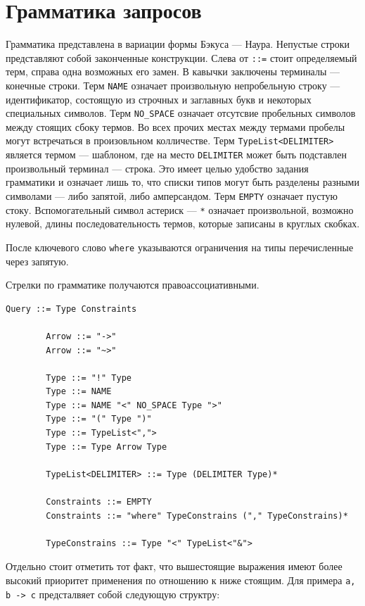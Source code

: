 \documentclass[times]{itmo-student-thesis}
\begin{document}
	\section{Грамматика запросов}
	Грамматика представлена в вариации формы Бэкуса — Наура. Непустые строки представляют собой законченные конструкции. Слева от \lstinline{::=} стоит определяемый терм, справа одна возможных его замен. В кавычки заключены терминалы --- конечные строки. Терм \lstinline{NAME} означает произвольную непробельную строку --- идентификатор, состоящую из строчных и заглавных букв и некоторых специальных символов. Терм \lstinline{NO_SPACE} означает отсутсвие пробельных символов между стоящих сбоку термов. Во всех прочих местах между термами пробелы могут встречаться в произовльном колличестве. Терм \lstinline{TypeList<DELIMITER>} является термом --- шаблоном, где на место \lstinline{DELIMITER} может быть подставлен произвольный терминал --- строка. Это имеет целью удобство задания грамматики и означает лишь то, что списки типов могут быть разделены разными символами --- либо запятой, либо амперсандом. Терм \lstinline{EMPTY} означает пустую стоку. Вспомогательный символ астериск --- \lstinline{*} означает произвольной, возможно нулевой, длины последовательность термов, которые записаны в круглых скобках.
	
	После ключевого слово \lstinline{where} указываются ограничения на типы перечисленные через запятую.
	
	Стрелки по грамматике получаются правоассоциативными.
	
	
	\begin{lstlisting}[caption={Грамматика запросов},label={query_grammar}]
		Query ::= Type Constraints
		
		Arrow ::= "->"
		Arrow ::= "~>"
		
		Type ::= "!" Type
		Type ::= NAME
		Type ::= NAME "<" NO_SPACE Type ">"
		Type ::= "(" Type ")"
		Type ::= TypeList<",">
		Type ::= Type Arrow Type
		
		TypeList<DELIMITER> ::= Type (DELIMITER Type)*
		
		Constraints ::= EMPTY
		Constraints ::= "where" TypeConstrains ("," TypeConstrains)*
		
		TypeConstrains ::= Type "<" TypeList<"&">
	\end{lstlisting}
	
	Отдельно стоит отметить тот факт, что вышестоящие выражения имеют более высокий приоритет применения по отношению к ниже стоящим. Для примера \lstinline{a, b -> c} предсталвяет собой следующую структру:
	
\end{document}
